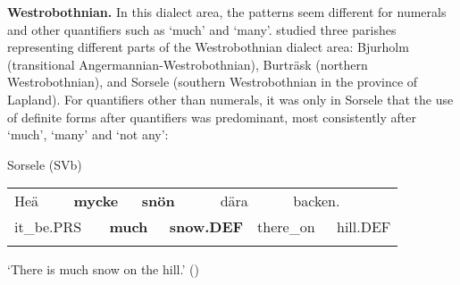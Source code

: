 \begin{styleBodytextC}
\textbf{Westrobothnian.} In this dialect area, the patterns seem different for numerals and other quantifiers such as ‘much’ and ‘many’. \citet{BergholmEtAl1999} studied three parishes representing different parts of the Westrobothnian dialect area: Bjurholm (transitional Angermannian-Westrobothnian), Burträsk (northern Westrobothnian), and Sorsele (southern Westrobothnian in the province of Lapland). For quantifiers other than numerals, it was only in Sorsele that the use of definite forms after quantifiers was predominant, most consistently after ‘much’, ‘many’ and ‘not any’:

\end{styleBodytextC}

\begin{listWWNumileveli}
\item {}

\begin{styleExample}
Sorsele (SVb)

\end{styleExample}

\end{listWWNumileveli}

\begin{listWWNumxxxivleveli}
\item {}

\end{listWWNumxxxivleveli}

\begin{tabular}{llllllllll}
\lsptoprule
Heä & \multicolumn{2}{l}{{\bfseries mycke}

} & \multicolumn{2}{l}{{\bfseries snön}

} & \multicolumn{2}{l}{dära

} & \multicolumn{2}{l}{backen.

} & \\
\multicolumn{2}{l}{it\_be.PRS

} & \multicolumn{2}{l}{{\bfseries much}

} & \multicolumn{2}{l}{{\bfseries snow.DEF}

} & \multicolumn{2}{l}{there\_on

} & \multicolumn{2}{l}{hill.DEF

}\\
\lspbottomrule
\end{tabular}

\begin{styleTranslation}
‘There is much snow on the hill.’ (\citet[24]{BergholmEtAl1999})

\end{styleTranslation}

